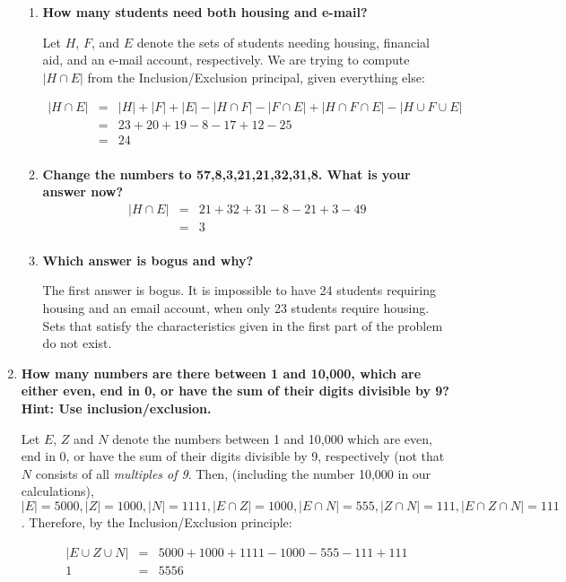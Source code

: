\documentclass[12pt]{amsart}
\begin{document}
\begin{enumerate}
\begin{enumerate}
\item {\bf How many students need both housing and e-mail?}

Let $H$, $F$, and $E$ denote the sets of students needing housing,
financial aid, and an e-mail account, respectively.  We are trying to
compute $|H \cap E|$ from the Inclusion/Exclusion principal, given
everything else:

\begin{eqnarray*}
|H \cap E| & = & |H| + |F| + |E| - |H \cap F| - |F \cap E| + |H \cap F \cap E| - |H \cup F \cup E| \\
& = & 23 + 20 + 19 - 8 - 17 + 12 - 25 \\
& = & 24 \\
\end{eqnarray*}

\item {\bf Change the numbers to 57,8,3,21,21,32,31,8.  What is your answer now?}
\begin{eqnarray*}
|H \cap E| & = & 21 + 32 + 31 - 8 - 21 + 3 - 49 \\
& = & 3 \\
\end{eqnarray*}
\item {\bf Which answer is bogus and why?}

The first answer is bogus.  It is impossible to have 24 students
requiring housing and an email account, when only 23 students require
housing.  Sets that satisfy the characteristics given in the first
part of the problem do not exist.

\end{enumerate}

\item {\bf How many numbers are there between 1 and 10,000, which are either even, end in 0, or have the sum of their digits divisible by 9?  Hint: Use inclusion/exclusion.}

Let $E$, $Z$ and $N$ denote the numbers between 1 and 10,000 which are
even, end in 0, or have the sum of their digits divisible by 9,
respectively (not that $N$ consists of all {\em multiples of 9}.
Then, (including the number 10,000 in our calculations), $|E| = 5000,
|Z| = 1000, |N| = 1111, |E \cap Z| = 1000, |E \cap N| = 555, |Z \cap
N| = 111, |E \cap Z \cap N| = 111$.  Therefore, by the
Inclusion/Exclusion principle:

\begin{eqnarray*}
|E \cup Z \cup N| & = & 5000 + 1000 + 1111 - 1000 - 555 - 111 + 111 \\
1& = & 5556
\end{eqnarray*}


\end{enumerate}
\end{document}
